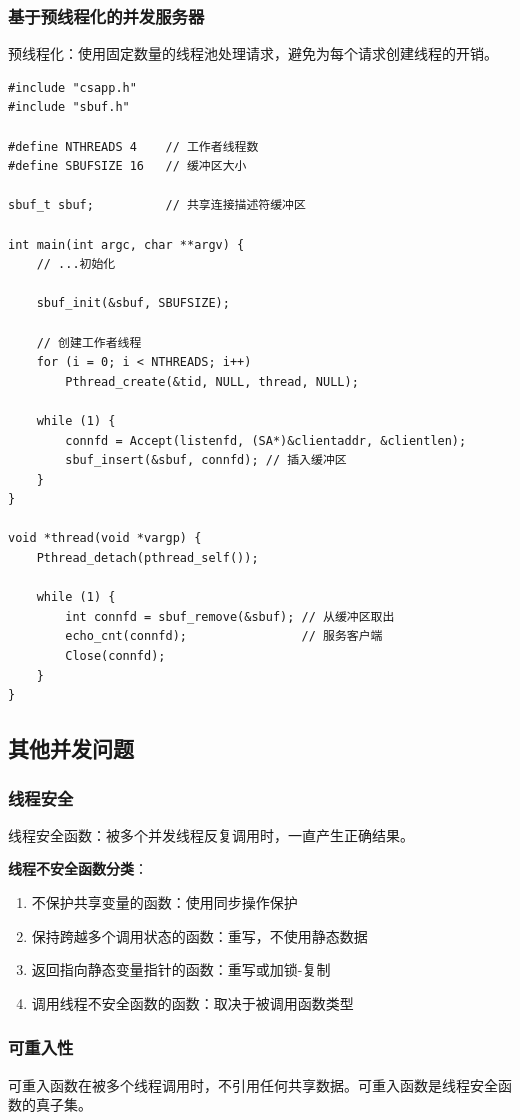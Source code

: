 \subsubsection{基于预线程化的并发服务器}
预线程化：使用固定数量的线程池处理请求，避免为每个请求创建线程的开销。
\begin{lstlisting}[style=CStyle]
#include "csapp.h"
#include "sbuf.h"

#define NTHREADS 4    // 工作者线程数
#define SBUFSIZE 16   // 缓冲区大小

sbuf_t sbuf;          // 共享连接描述符缓冲区

int main(int argc, char **argv) {
    // ...初始化
    
    sbuf_init(&sbuf, SBUFSIZE);
    
    // 创建工作者线程
    for (i = 0; i < NTHREADS; i++)
        Pthread_create(&tid, NULL, thread, NULL);
        
    while (1) {
        connfd = Accept(listenfd, (SA*)&clientaddr, &clientlen);
        sbuf_insert(&sbuf, connfd); // 插入缓冲区
    }
}

void *thread(void *vargp) {
    Pthread_detach(pthread_self());
    
    while (1) {
        int connfd = sbuf_remove(&sbuf); // 从缓冲区取出
        echo_cnt(connfd);                // 服务客户端
        Close(connfd);
    }
}
\end{lstlisting}

\subsection{其他并发问题}

\subsubsection{线程安全}
线程安全函数：被多个并发线程反复调用时，一直产生正确结果。

\textbf{线程不安全函数分类}：
\begin{enumerate}
    \item 不保护共享变量的函数：使用同步操作保护
    \item 保持跨越多个调用状态的函数：重写，不使用静态数据
    \item 返回指向静态变量指针的函数：重写或加锁-复制
    \item 调用线程不安全函数的函数：取决于被调用函数类型
\end{enumerate}

\subsubsection{可重入性}
可重入函数在被多个线程调用时，不引用任何共享数据。可重入函数是线程安全函数的真子集。

